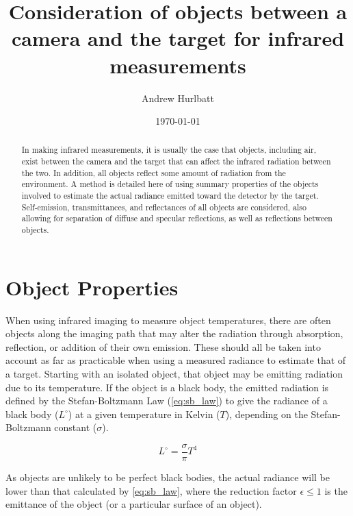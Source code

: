 \documentclass[11pt,a4paper]{article}
\title{Consideration of objects between a camera and the target for infrared measurements}
\author{Andrew Hurlbatt}
\date{\today}
\begin{document}
	
	\maketitle
	
	\begin{abstract}
		In making infrared measurements, it is usually the case that objects, including air, exist between the camera and the target that can affect the infrared radiation between the two. In addition, all objects reflect some amount of radiation from the environment. A method is detailed here of using summary properties of the objects involved to estimate the actual radiance emitted toward the detector by the target. Self-emission, transmittances, and reflectances of all objects are considered, also allowing for separation of diffuse and specular reflections, as well as reflections between objects.
	\end{abstract}

\section{Object Properties}

When using infrared imaging to measure object temperatures, there are often objects along the imaging path that may alter the radiation through absorption, reflection, or addition of their own emission. These should all be taken into account as far as practicable when using a measured radiance to estimate that of a target. Starting with an isolated object, that object may be emitting radiation due to its temperature. If the object is a black body, the emitted radiation is defined by the Stefan-Boltzmann Law (\cref{eq:sb_law}) to give the radiance of a black body ($ L^\circ $) at a given temperature in Kelvin ($ T $), depending on the Stefan-Boltzmann constant ($ \sigma $).

\begin{equation}\label{eq:sb_law}
	L^\circ = \frac{\sigma}{\pi} T^4
\end{equation}

As objects are unlikely to be perfect black bodies, the actual radiance will be lower than that calculated by \cref{eq:sb_law}, where the reduction factor $ \epsilon \le 1 $ is the emittance of the object (or a particular surface of an object).
\end{document}
